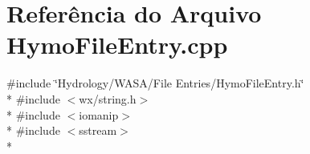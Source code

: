 \section{Referência do Arquivo Hymo\+File\+Entry.\+cpp}
\label{_hymo_file_entry_8cpp}
{\ttfamily \#include \char`\"{}Hydrology/\+W\+A\+S\+A/\+File Entries/\+Hymo\+File\+Entry.\+h\char`\"{}}\\*
{\ttfamily \#include $<$wx/string.\+h$>$}\\*
{\ttfamily \#include $<$iomanip$>$}\\*
{\ttfamily \#include $<$sstream$>$}\\*
